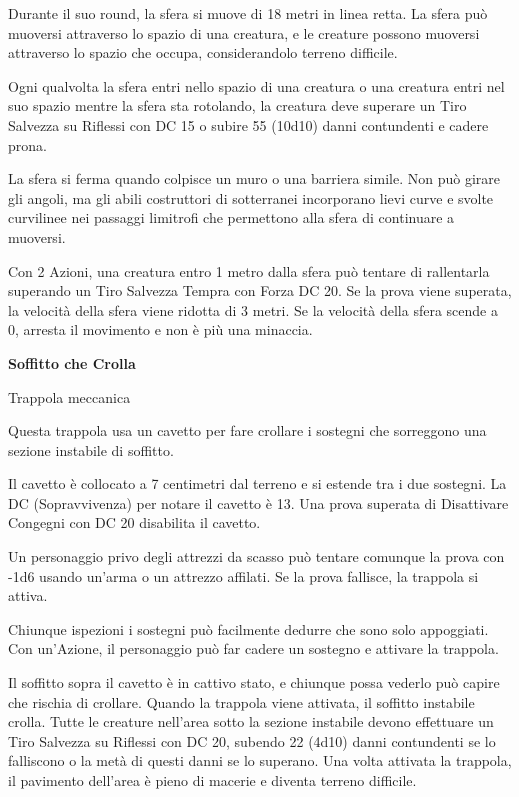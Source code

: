 \begin{multicols}{2}
Durante il suo round, la sfera si muove di 18 metri in linea retta. La sfera può muoversi attraverso lo spazio di una creatura, e le creature possono muoversi attraverso lo spazio che occupa, considerandolo terreno difficile.

Ogni qualvolta la sfera entri nello spazio di una creatura o una creatura entri nel suo spazio mentre la sfera sta rotolando, la creatura deve superare un Tiro Salvezza su Riflessi con DC 15 o subire 55 (10d10) danni contundenti e cadere prona.

La sfera si ferma quando colpisce un muro o una barriera simile. Non può girare gli angoli, ma gli abili costruttori di sotterranei incorporano lievi curve e svolte curvilinee nei passaggi limitrofi che permettono alla sfera di continuare a muoversi.

Con 2 Azioni, una creatura entro 1 metro dalla sfera può tentare di rallentarla superando un Tiro Salvezza Tempra con Forza DC 20. Se la prova viene superata, la velocità della sfera viene ridotta di 3 metri. Se la velocità della sfera scende a 0, arresta il movimento e non è più una minaccia.

\medskip

\textbf{Soffitto che Crolla}

Trappola meccanica

Questa trappola usa un cavetto per fare crollare i sostegni che sorreggono una sezione instabile di soffitto.

Il cavetto è collocato a 7 centimetri dal terreno e si estende tra i due sostegni. La DC (Sopravvivenza) per notare il cavetto è 13. Una prova superata di Disattivare Congegni con DC 20 disabilita il cavetto.

Un personaggio privo degli attrezzi da scasso può tentare comunque la prova con -1d6 usando un'arma o un attrezzo affilati. Se la prova fallisce, la trappola si attiva.

Chiunque ispezioni i sostegni può facilmente dedurre che sono solo appoggiati. Con un'Azione, il personaggio può far cadere un sostegno e attivare la trappola.

Il soffitto sopra il cavetto è in cattivo stato, e chiunque possa vederlo può capire che rischia di crollare. Quando la trappola viene attivata, il soffitto instabile crolla. Tutte le creature nell'area sotto la sezione instabile devono effettuare un Tiro Salvezza su Riflessi con DC 20, subendo 22 (4d10) danni contundenti se lo falliscono o la metà di questi danni se lo superano. Una volta attivata la trappola, il pavimento dell'area è pieno di macerie e diventa terreno difficile.



\end{multicols}
